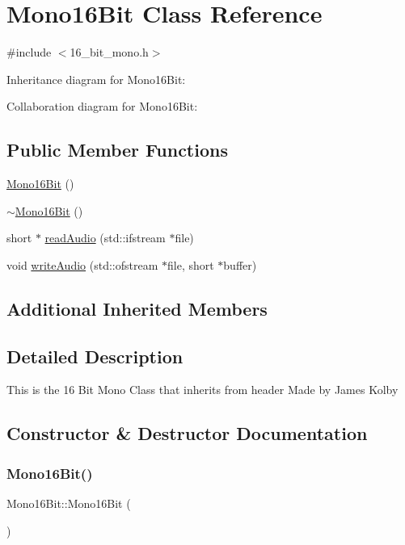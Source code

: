 \hypertarget{classMono16Bit}{}\section{Mono16\+Bit Class Reference}
\label{classMono16Bit}


{\ttfamily \#include $<$16\+\_\+bit\+\_\+mono.\+h$>$}



Inheritance diagram for Mono16\+Bit\+:


Collaboration diagram for Mono16\+Bit\+:
\subsection*{Public Member Functions}
\begin{DoxyCompactItemize}
\item 
\hyperlink{classMono16Bit_a41534a9f56264dc05353a7c9484b35bb}{Mono16\+Bit} ()
\item 
\hyperlink{classMono16Bit_a813c10ea813d3b06bd33602b4a24c8c6}{$\sim$\+Mono16\+Bit} ()
\item 
short $\ast$ \hyperlink{classMono16Bit_aaf15021eb1430170f892278aeac8ba10}{read\+Audio} (std\+::ifstream $\ast$file)
\item 
void \hyperlink{classMono16Bit_a3ef28645b53a11ca002344cf31d7c988}{write\+Audio} (std\+::ofstream $\ast$file, short $\ast$buffer)
\end{DoxyCompactItemize}
\subsection*{Additional Inherited Members}


\subsection{Detailed Description}
This is the 16 Bit Mono Class that inherits from header Made by James Kolby 

\subsection{Constructor \& Destructor Documentation}
\mbox{\label{classMono16Bit_a41534a9f56264dc05353a7c9484b35bb}} 
\subsubsection{\texorpdfstring{Mono16\+Bit()}{Mono16Bit()}}
{\footnotesize\ttfamily Mono16\+Bit\+::\+Mono16\+Bit (\begin{DoxyParamCaption}{ }\end{DoxyParamCaption})}

